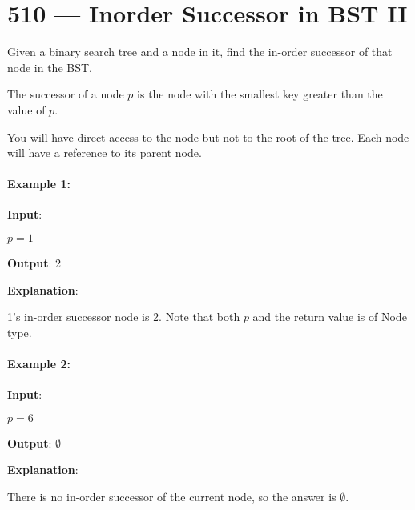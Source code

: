 \section{510 --- Inorder Successor in BST II}
Given a binary search tree and a node in it, find the in-order successor of that node in the BST.

The successor of a node $p$ is the node with the smallest key greater than the value of $p$.

You will have direct access to the node but not to the root of the tree. Each node will have a reference to its parent node.
 

\paragraph{Example 1:}

\begin{flushleft}

\textbf{Input}:

\begin{figure}[H]
\end{figure}
 
$ p = 1 $

\textbf{Output}: 2

\textbf{Explanation}: 

1's in-order successor node is 2. Note that both $p$ and the return value is of Node type.
\end{flushleft}

\paragraph{Example 2:}

\begin{flushleft}
\textbf{Input}: 
\begin{figure}[H]
\end{figure}
$ p = 6 $

\textbf{Output}: $\emptyset$

\textbf{Explanation}: 

There is no in-order successor of the current node, so the answer is $\emptyset$.
\end{flushleft}

